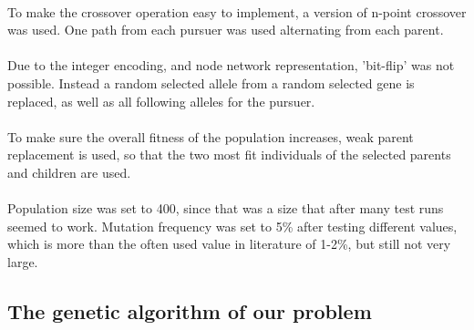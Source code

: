 \\To make the crossover operation easy to implement, a version of n-point crossover was used. One path from each pursuer was used alternating from each parent.\\
\\Due to the integer encoding, and node network representation, 'bit-flip' was not possible. Instead a random selected allele from a random selected gene is replaced, as well as all following alleles for the pursuer.\\
\\To make sure the overall fitness of the population increases, weak parent replacement is used, so that the two most fit individuals of the selected parents and children are used.\\
\\Population size was set to 400, since that was a size that after many test runs seemed to work. Mutation frequency was set to 5\% after testing different values, which is more than the often used value in literature \cite{GAHandbook2} of 1-2\%, but still not very large.

\subsection{The genetic algorithm of our problem}


